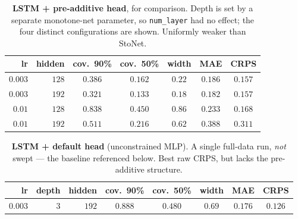 \documentclass[11pt]{article}
\begin{document}
\begin{table}[h]
  \centering
  \caption{\textbf{LSTM + pre-additive head}, for comparison. Depth is set by a
  separate monotone-net parameter, so \texttt{num\_layer} had no effect; the four
  distinct configurations are shown. Uniformly weaker than StoNet.}
  \label{tab:preadd}
  \begin{tabular}{rr ccccc}
    \toprule
    lr & hidden & cov.\ 90\% & cov.\ 50\% & width & MAE & CRPS \\
    \midrule
    $0.003$ & $128$ & $0.386$ & $0.162$ & $0.22$ & $0.186$ & $0.157$ \\
    $0.003$ & $192$ & $0.321$ & $0.133$ & $0.18$ & $0.182$ & $0.157$ \\
    $0.01$  & $128$ & $0.838$ & $0.450$ & $0.86$ & $0.233$ & $0.168$ \\
    $0.01$  & $192$ & $0.511$ & $0.216$ & $0.62$ & $0.388$ & $0.311$ \\
    \bottomrule
  \end{tabular}
\end{table}

\begin{table}[h]
  \centering
  \caption{\textbf{LSTM + default head} (unconstrained MLP). A single full-data run,
  \emph{not} swept --- the baseline referenced below. Best raw CRPS, but lacks the
  pre-additive structure.}
  \label{tab:default}
  \begin{tabular}{rrr ccccc}
    \toprule
    lr & depth & hidden & cov.\ 90\% & cov.\ 50\% & width & MAE & CRPS \\
    \midrule
    $0.003$ & $3$ & $192$ & $0.888$ & $0.480$ & $0.69$ & $0.176$ & $0.126$ \\
    \bottomrule
  \end{tabular}
\end{table}
\end{document}
